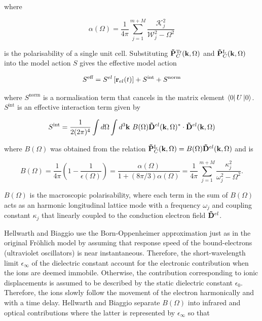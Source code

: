 where

\begin{equation}
    \alpha(\Omega) = \frac{1}{4\pi} \sum_{j=1}^{m+M} \frac{\mathcal{K}_j^2}{\mathcal{W}_j^2 - \Omega^2}
\end{equation}

is the polarisability of a single unit cell. Substituting $\vb{\Tilde{P}}^{\text{Tr}}_{C}(\vb{k}, \Omega)$ and $\vb{\Tilde{P}}^{\text{L}}_{C}(\vb{k}, \Omega)$ into the model action $S$ gives the effective model action 

\begin{equation}
    S^{\text{eff}} = S^{el}\left[ \vb{r}_{el}(t) \right] + S^{\text{int}} + S^{\text{norm}}
\end{equation}

where $S^{\text{norm}}$ is a normalisation term that cancels in the matrix element $\bra{0} U \ket{0}$. $S^{\text{int}}$ is an effective interaction term given by

\begin{equation}
    S^{\text{int}} = \frac{1}{2 (2\pi)^4} \int d\Omega \int d^3 \vb{k}\ B(\Omega) \vb{\Tilde{D}}^{el}(\vb{k}, \Omega)^* \cdot \vb{\Tilde{D}}^{el}(\vb{k}, \Omega)
\end{equation}

where $B(\Omega)$ was obtained from the relation $\vb{\Tilde{P}}^{\text{L}}_{C}(\vb{k}, \Omega) = B(\Omega) \vb{\Tilde{D}}^{el}(\vb{k}, \Omega)$ and is

\begin{equation}
    B(\Omega) = \frac{1}{4\pi} \left( 1 - \frac{1}{\epsilon(\Omega)} \right) = \frac{\alpha(\Omega)}{1+(8\pi/3)\alpha(\Omega)} = \frac{1}{4\pi} \sum_{j = 1}^{m + M} \frac{\kappa_j^2}{\omega_j^2 - \Omega^2}.
\end{equation}

$B(\Omega)$ is the macroscopic polarisability, where each term in the sum of $B(\Omega)$ acts as an harmonic longitudinal lattice mode with a frequency $\omega_j$ and coupling constant $\kappa_j$ that linearly coupled to the conduction electron field $\vb{\Tilde{D}}^{el}$. 

Hellwarth and Biaggio use the Born-Oppenheimer approximation just as in the original Fr\"ohlich model by assuming that response speed of the bound-electrons (ultraviolet oscillators) is near instantaneous. Therefore, the short-wavelength limit $\epsilon_\infty$ of the dielectric constant account for the electronic contribution when the ions are deemed immobile. Otherwise, the contribution corresponding to ionic displacements is assumed  to be described by the static dielectric constant $\epsilon_0$. Therefore, the ions slowly follow the movement of the electron harmonically and with a time delay. Hellwarth and Biaggio separate $B(\Omega)$ into infrared and optical contributions where the latter is represented by $\epsilon_\infty$ so that

